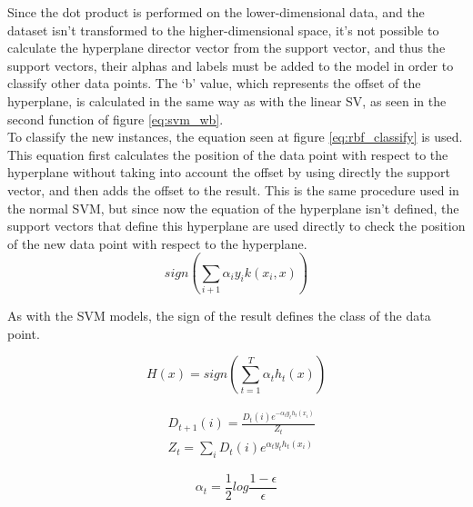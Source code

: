 \documentclass[10pt, journal]{IEEEtran}
\begin{document}
Since the dot product is performed on the lower-dimensional data, and the dataset isn't transformed to the higher-dimensional space, it's not possible to calculate the hyperplane director vector from the support vector, and thus the support vectors, their alphas and labels must be added to the model in order to classify other data points. The `b' value, which represents the offset of the hyperplane, is calculated in the same way as with the linear SV, as seen in the second function of figure \ref{eq:svm_wb}.\\

To classify the new instances, the equation seen at figure \ref{eq:rbf_classify} is used. This equation first calculates the position of the data point with respect to the hyperplane without taking into account the offset by using directly the support vector, and then adds the offset to the result. This is the same procedure used in the normal SVM, but since now the equation of the hyperplane isn’t defined, the support vectors that define this hyperplane are used directly to check the position of the new data point with respect to the hyperplane.\\

\begin{equation}
	sign(\sum_{i+1}{\alpha_{i}y_i k(x_i,x)})
	\label{eq:rbf_classify}
\end{equation}

As with the SVM models, the sign of the result defines the class of the data point.






\begin{equation}
	H(x) = sign(\sum_{t=1}^{T}{\alpha_t h_t(x)})
	\label{eq:ada_classify}
\end{equation}

\begin{equation}
	\begin{aligned}
	&D_{t+1}(i) = \frac{D_t(i)e^{-\alpha_ty_th_t(x_i)}}{Z_t}\\
	&Z_t = \sum_{i}{D_t(i)e^{\alpha_ty_th_t(x_i)}}
	\end{aligned}
	\label{ada_updweights}
\end{equation}

\begin{equation}
	\alpha_t = \frac{1}{2}log\frac{1-\epsilon}{\epsilon}
	\label{ada_alpha}
\end{equation}
\end{document}
